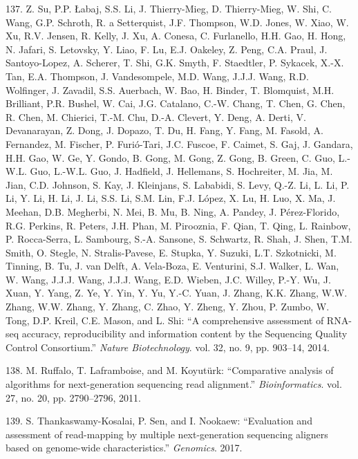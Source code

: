 \documentclass[12pt,a4paper,twoside]{ugathesis}
\theoremstyle{definition}
\theoremstyle{definition}
\theoremstyle{definition}
\theoremstyle{remark}
\begin{document}
\hypertarget{ref-Su2014}{}
137. Z. Su, P.P. Łabaj, S.S. Li, J. Thierry-Mieg, D. Thierry-Mieg, W.
Shi, C. Wang, G.P. Schroth, R. a Setterquist, J.F. Thompson, W.D. Jones,
W. Xiao, W. Xu, R.V. Jensen, R. Kelly, J. Xu, A. Conesa, C. Furlanello,
H.H. Gao, H. Hong, N. Jafari, S. Letovsky, Y. Liao, F. Lu, E.J. Oakeley,
Z. Peng, C.A. Praul, J. Santoyo-Lopez, A. Scherer, T. Shi, G.K. Smyth,
F. Staedtler, P. Sykacek, X.-X. Tan, E.A. Thompson, J. Vandesompele,
M.D. Wang, J.J.J. Wang, R.D. Wolfinger, J. Zavadil, S.S. Auerbach, W.
Bao, H. Binder, T. Blomquist, M.H. Brilliant, P.R. Bushel, W. Cai, J.G.
Catalano, C.-W. Chang, T. Chen, G. Chen, R. Chen, M. Chierici, T.-M.
Chu, D.-A. Clevert, Y. Deng, A. Derti, V. Devanarayan, Z. Dong, J.
Dopazo, T. Du, H. Fang, Y. Fang, M. Fasold, A. Fernandez, M. Fischer, P.
Furió-Tari, J.C. Fuscoe, F. Caimet, S. Gaj, J. Gandara, H.H. Gao, W. Ge,
Y. Gondo, B. Gong, M. Gong, Z. Gong, B. Green, C. Guo, L.-W.L. Guo,
L.-W.L. Guo, J. Hadfield, J. Hellemans, S. Hochreiter, M. Jia, M. Jian,
C.D. Johnson, S. Kay, J. Kleinjans, S. Lababidi, S. Levy, Q.-Z. Li, L.
Li, P. Li, Y. Li, H. Li, J. Li, S.S. Li, S.M. Lin, F.J. López, X. Lu, H.
Luo, X. Ma, J. Meehan, D.B. Megherbi, N. Mei, B. Mu, B. Ning, A. Pandey,
J. Pérez-Florido, R.G. Perkins, R. Peters, J.H. Phan, M. Pirooznia, F.
Qian, T. Qing, L. Rainbow, P. Rocca-Serra, L. Sambourg, S.-A. Sansone,
S. Schwartz, R. Shah, J. Shen, T.M. Smith, O. Stegle, N. Stralis-Pavese,
E. Stupka, Y. Suzuki, L.T. Szkotnicki, M. Tinning, B. Tu, J. van Delft,
A. Vela-Boza, E. Venturini, S.J. Walker, L. Wan, W. Wang, J.J.J. Wang,
J.J.J. Wang, E.D. Wieben, J.C. Willey, P.-Y. Wu, J. Xuan, Y. Yang, Z.
Ye, Y. Yin, Y. Yu, Y.-C. Yuan, J. Zhang, K.K. Zhang, W.W. Zhang, W.W.
Zhang, Y. Zhang, C. Zhao, Y. Zheng, Y. Zhou, P. Zumbo, W. Tong, D.P.
Kreil, C.E. Mason, and L. Shi: ``A comprehensive assessment of RNA-seq
accuracy, reproducibility and information content by the Sequencing
Quality Control Consortium.'' \emph{Nature Biotechnology}. vol. 32, no.
9, pp. 903--14, 2014.

\hypertarget{ref-Ruffalo2011}{}
138. M. Ruffalo, T. Laframboise, and M. Koyutürk: ``Comparative analysis
of algorithms for next-generation sequencing read alignment.''
\emph{Bioinformatics}. vol. 27, no. 20, pp. 2790--2796, 2011.

\hypertarget{ref-Thankaswamy-Kosalai2017}{}
139. S. Thankaswamy-Kosalai, P. Sen, and I. Nookaew: ``Evaluation and
assessment of read-mapping by multiple next-generation sequencing
aligners based on genome-wide characteristics.'' \emph{Genomics}. 2017.
\end{document}
